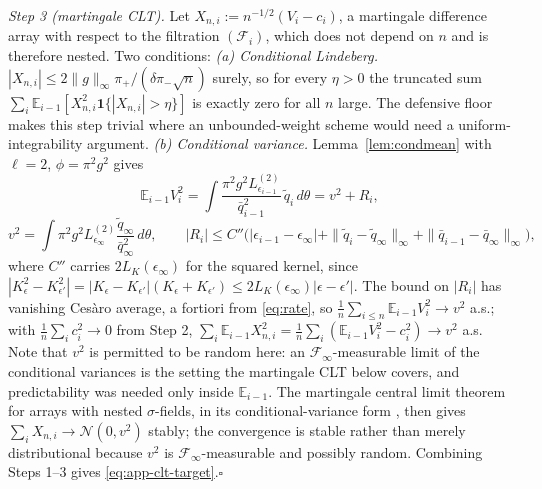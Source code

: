 \documentclass[10pt]{article}
\theoremstyle{plain}
\theoremstyle{definition}
\begin{document}
\emph{Step 3 (martingale CLT).} Let $X_{n,i}:=n^{-1/2}(V_i-c_i)$, a martingale difference array with respect to the filtration $(\mathcal{F}_i)$, which does not depend on $n$ and is therefore nested. Two conditions:
\emph{(a) Conditional Lindeberg.} $|X_{n,i}|\le2\|g\|_\infty\pi_+/(\delta\pi_-\sqrt n)$ surely, so for every $\eta>0$ the truncated sum $\sum_i\mathbb{E}_{i-1}[X^2_{n,i}\mathbf{1}\{|X_{n,i}|>\eta\}]$ is exactly zero for all $n$ large. The defensive floor makes this step trivial where an unbounded-weight scheme would need a uniform-integrability argument.
\emph{(b) Conditional variance.} Lemma~\ref{lem:condmean} with $\ell=2$, $\phi=\pi^2g^2$ gives
\[
\mathbb{E}_{i-1}V_i^2=\int\frac{\pi^2g^2L^{(2)}_{\epsilon_{i-1}}}{\bar q^2_{i-1}}\,\tilde q_i\,d\theta
=v^2+R_i,
\]
\[
v^2=\int\pi^2g^2L^{(2)}_{\epsilon_\infty}\frac{\tilde q_\infty}{\bar q^2_\infty}\,d\theta,
\qquad
|R_i|\le C''\bigl(|\epsilon_{i-1}-\epsilon_\infty|+\|\tilde q_i-\tilde q_\infty\|_\infty+\|\bar q_{i-1}-\bar q_\infty\|_\infty\bigr),
\]
where $C''$ carries $2L_K(\epsilon_\infty)$ for the squared kernel, since $|K^2_\epsilon-K^2_{\epsilon'}|=|K_\epsilon-K_{\epsilon'}|(K_\epsilon+K_{\epsilon'})\le2L_K(\epsilon_\infty)|\epsilon-\epsilon'|$. The bound on $|R_i|$ has vanishing Ces\`aro average, a fortiori from \eqref{eq:rate}, so $\tfrac1n\sum_{i\le n}\mathbb{E}_{i-1}V^2_i\to v^2$ a.s.; with $\tfrac1n\sum_ic^2_i\to0$ from Step 2,
$\sum_i\mathbb{E}_{i-1}X^2_{n,i}=\tfrac1n\sum_i(\mathbb{E}_{i-1}V^2_i-c^2_i)\to v^2$ a.s. Note that $v^2$ is permitted to be random here: an $\mathcal{F}_\infty$-measurable limit of the conditional variances is the setting the martingale CLT below covers, and predictability was needed only inside $\mathbb{E}_{i-1}$.
The martingale central limit theorem for arrays with nested $\sigma$-fields, in its conditional-variance form \citep[Cor.~3.1, pp.~58--59]{hall1980martingale}, then gives $\sum_iX_{n,i}\to\mathcal{N}(0,v^2)$ stably; the convergence is stable rather than merely distributional because $v^2$ is $\mathcal{F}_\infty$-measurable and possibly random. Combining Steps 1--3 gives \eqref{eq:app-clt-target}.\hfill$\square$
\end{document}
